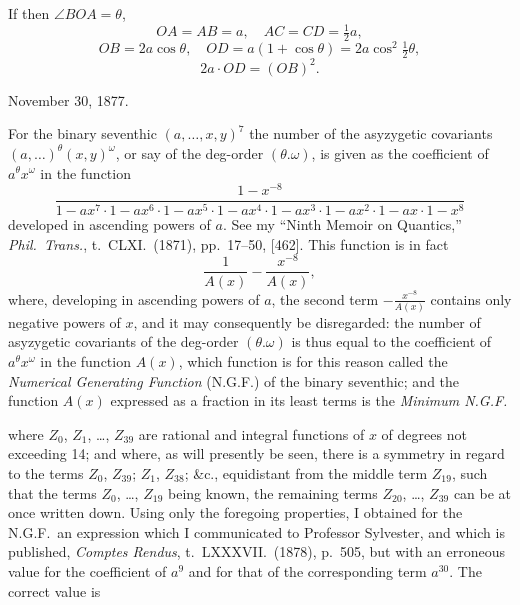 \documentclass[11pt,a4paper]{book}
\providecommand{\between}{,}
\begin{document}
If then $\angle BOA = \theta$,
\[
OA = AB = a, \quad AC = CD = \tfrac{1}{2}a,
\]
\[
OB = 2a\cos\theta, \quad OD = a(1 + \cos\theta) = 2a\cos^2\tfrac{1}{2}\theta,
\]
\[
2a \cdot OD = (OB)^2.
\]

November 30, 1877.

\clearpage

For the binary seventhic $(a, \dots \between x, y)^7$ the number of the asyzygetic covariants $(a, \dots)^\theta(x, y)^\omega$, or say of the deg-order $(\theta . \omega)$, is given as the coefficient of $a^\theta x^\omega$ in the function
\[
\frac{1 - x^{-8}}{1 - ax^7 \cdot 1 - ax^6 \cdot 1 - ax^5 \cdot 1 - ax^4 \cdot 1 - ax^3 \cdot 1 - ax^2 \cdot 1 - ax \cdot 1 - x^8}
\]
developed in ascending powers of $a$. See my ``Ninth Memoir on Quantics,'' \textit{Phil.\ Trans.}, t.\ CLXI.\ (1871), pp.\ 17--50, [462]. This function is in fact
\[
\frac{1}{A(x)} - \frac{x^{-8}}{A(x)},
\]
where, developing in ascending powers of $a$, the second term $-\frac{x^{-8}}{A(x)}$ contains only negative powers of $x$, and it may consequently be disregarded: the number of asyzygetic covariants of the deg-order $(\theta . \omega)$ is thus equal to the coefficient of $a^\theta x^\omega$ in the function $A(x)$, which function is for this reason called the \textit{Numerical Generating Function} (N.G.F.) of the binary seventhic; and the function $A(x)$ expressed as a fraction in its least terms is the \textit{Minimum N.G.F.}

\clearpage
where $Z_0$, $Z_1$, \dots, $Z_{39}$ are rational and integral functions of $x$ of degrees not exceeding 14; and where, as will presently be seen, there is a symmetry in regard to the terms $Z_0$, $Z_{39}$; $Z_1$, $Z_{38}$; \&c., equidistant from the middle term $Z_{19}$, such that the terms $Z_0$, \dots, $Z_{19}$ being known, the remaining terms $Z_{20}$, \dots, $Z_{39}$ can be at once written down. Using only the foregoing properties, I obtained for the N.G.F.\ an expression which I communicated to Professor Sylvester, and which is published, \textit{Comptes Rendus}, t.\ LXXXVII.\ (1878), p.\ 505, but with an erroneous value for the coefficient of $a^9$ and for that of the corresponding term $a^{30}$. The correct value is
\end{document}
